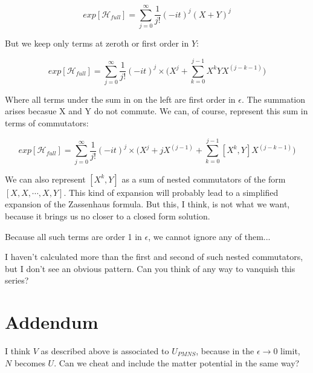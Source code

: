 \documentclass[10pt,letterpaper]{article}
\begin{document}
$$exp[\mathcal{H}_{full}] = \sum_{j=0}^{\infty} \frac{1}{j!} (-it)^j(X + Y)^j$$

But we keep only terms at zeroth or first order in $Y$:



$$exp[\mathcal{H}_{full}] = \sum_{j=0}^{\infty} \frac{1}{j!} (-it)^j \times \big(X^j + \sum_{k=0}^{j-1} X^k Y X^{(j-k-1)}\big)$$

Where all terms under the sum in on the left are first order in $\epsilon$. The summation arises becasue X and Y do not commute. We can, of course, represent this sum in terms of commutators:

$$exp[\mathcal{H}_{full}] = \sum_{j=0}^{\infty} \frac{1}{j!} (-it)^j \times \big(X^j + jX^{(j-1)} + \sum_{k=0}^{j-1} [X^k,Y] X^{(j-k-1)}\big)$$

We can also represent $[X^k,Y]$ as a sum of nested commutators of the form $[X,X,\cdots,X,Y]$. This kind of expansion will probably lead to a simplified expansion of the Zassenhaus formula. But this, I think, is not what we want, because it brings us no closer to a closed form solution.

Because all such terms are order 1 in $\epsilon$, we cannot ignore any of them...

I haven't calculated more than the first and second of such nested commutators, but I don't see an obvious pattern. Can you think of any way to vanquish this series?

\section*{Addendum}

I think $V$ as described above is associated to $U_{PMNS}$, because in the $\epsilon \rightarrow 0$ limit, $N$ becomes $U$. Can we cheat and include the matter potential in the same way?


 
\end{document}
